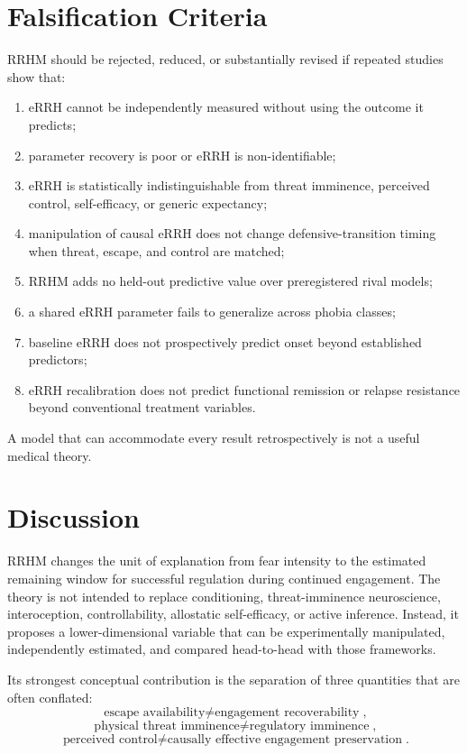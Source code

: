 \documentclass[9pt,twocolumn]{article}
\begin{document}
\section{Falsification Criteria}
RRHM should be rejected, reduced, or substantially revised if repeated studies show that:
\begin{enumerate}[leftmargin=2em]
\item eRRH cannot be independently measured without using the outcome it predicts;
\item parameter recovery is poor or eRRH is non-identifiable;
\item eRRH is statistically indistinguishable from threat imminence, perceived control, self-efficacy, or generic expectancy;
\item manipulation of causal eRRH does not change defensive-transition timing when threat, escape, and control are matched;
\item RRHM adds no held-out predictive value over preregistered rival models;
\item a shared eRRH parameter fails to generalize across phobia classes;
\item baseline eRRH does not prospectively predict onset beyond established predictors;
\item eRRH recalibration does not predict functional remission or relapse resistance beyond conventional treatment variables.
\end{enumerate}

A model that can accommodate every result retrospectively is not a useful medical theory.

\section{Discussion}
RRHM changes the unit of explanation from fear intensity to the estimated remaining window for successful regulation during continued engagement. The theory is not intended to replace conditioning, threat-imminence neuroscience, interoception, controllability, allostatic self-efficacy, or active inference. Instead, it proposes a lower-dimensional variable that can be experimentally manipulated, independently estimated, and compared head-to-head with those frameworks.

Its strongest conceptual contribution is the separation of three quantities that are often conflated:
\[
\boxed{\text{escape availability}\neq\text{engagement recoverability}},
\]
\[
\boxed{\text{physical threat imminence}\neq\text{regulatory imminence}},
\]
\[
\boxed{\text{perceived control}\neq\text{causally effective engagement preservation}}.
\]
\end{document}
